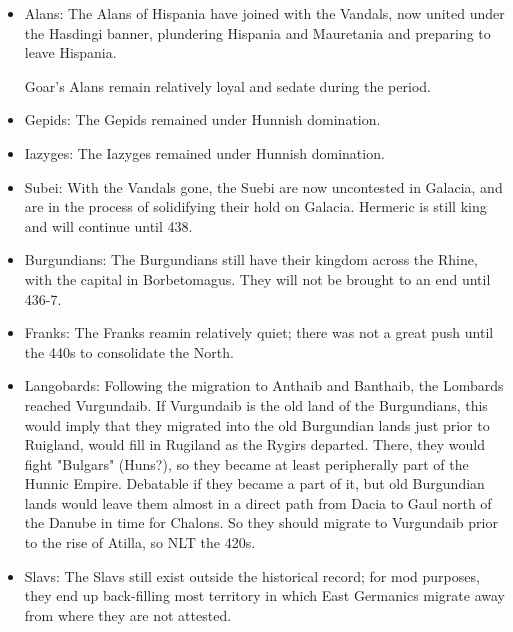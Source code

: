 \documentclass{article}
\begin{document}
\begin{itemize}
		\item Alans:\newline
		The Alans of Hispania have joined with the Vandals, now united under the Hasdingi banner, plundering Hispania and Mauretania and preparing to leave Hispania.
		
		Goar's Alans remain relatively loyal and sedate during the period.
		
		\item Gepids:\newline
		The Gepids remained under Hunnish domination.
		
		\item Iazyges:\newline
		The Iazyges remained under Hunnish domination.
		
		\item Subei:\newline
		With the Vandals gone, the Suebi are now uncontested in Galacia, and are in the process of solidifying their hold on Galacia.
		Hermeric is still king and will continue until 438.
		
		\item Burgundians:\newline
		The Burgundians still have their kingdom across the Rhine, with the capital in Borbetomagus.
		They will not be brought to an end until 436-7.
		
		\item Franks:\newline
		The Franks reamin relatively quiet; there was not a great push until the 440s to consolidate the North.
		
		\item Langobards:\newline
		Following the migration to Anthaib and Banthaib, the Lombards reached Vurgundaib.
		If Vurgundaib is the old land of the Burgundians, this would imply that they migrated into the old Burgundian lands just prior to Ruigland, would fill in Rugiland as the Rygirs departed.
		There, they would fight "Bulgars" (Huns?), so they became at least peripherally part of the Hunnic Empire.
		Debatable if they became a part of it, but old Burgundian lands would leave them almost in a direct path from Dacia to Gaul north of the Danube in time for Chalons.
		So they should migrate to Vurgundaib prior to the rise of Atilla, so NLT the 420s.
		
		\item Slavs:\newline
		The Slavs still exist outside the historical record; for mod purposes, they end up back-filling most territory in which East Germanics migrate away from where they are not attested.
	\end{itemize}
	
\end{document}

